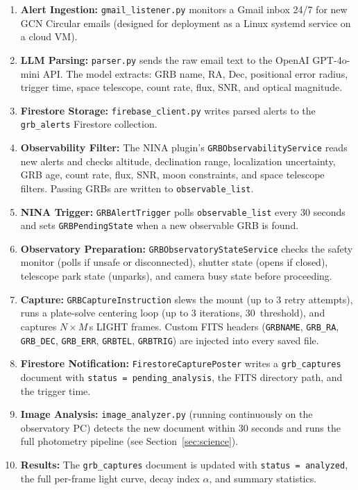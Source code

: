 \documentclass[12pt,a4paper]{article}
\begin{document}
\begin{enumerate}[leftmargin=*]
    \item \textbf{Alert Ingestion:} \texttt{gmail\_listener.py} monitors a
          Gmail inbox 24/7 for new GCN Circular emails (designed for
          deployment as a Linux systemd service on a cloud VM).
    \item \textbf{LLM Parsing:} \texttt{parser.py} sends the raw email text
          to the OpenAI GPT-4o-mini API. The model extracts: GRB name, RA,
          Dec, positional error radius, trigger time, space telescope,
          count rate, flux, SNR, and optical magnitude.
    \item \textbf{Firestore Storage:} \texttt{firebase\_client.py} writes
          parsed alerts to the \texttt{grb\_alerts} Firestore collection.
    \item \textbf{Observability Filter:} The NINA plugin's
          \texttt{GRBObservabilityService} reads new alerts and checks
          altitude, declination range, localization uncertainty, GRB age,
          count rate, flux, SNR, moon constraints, and space telescope
          filters. Passing GRBs are written to \texttt{observable\_list}.
    \item \textbf{NINA Trigger:} \texttt{GRBAlertTrigger} polls
          \texttt{observable\_list} every 30 seconds and sets
          \texttt{GRBPendingState} when a new observable GRB is found.
    \item \textbf{Observatory Preparation:} \texttt{GRBObservatoryStateService}
          checks the safety monitor (polls if unsafe or disconnected), shutter
          state (opens if closed), telescope park state (unparks), and camera
          busy state before proceeding.
    \item \textbf{Capture:} \texttt{GRBCaptureInstruction} slews the mount
          (up to 3 retry attempts), runs a plate-solve centering loop
          (up to 3 iterations, 30\arcsec\ threshold), and captures
          $N \times M$\,s LIGHT frames. Custom FITS headers
          (\texttt{GRBNAME}, \texttt{GRB\_RA}, \texttt{GRB\_DEC},
          \texttt{GRB\_ERR}, \texttt{GRBTEL}, \texttt{GRBTRIG}) are injected
          into every saved file.
    \item \textbf{Firestore Notification:} \texttt{FirestoreCapturePoster}
          writes a \texttt{grb\_captures} document with
          \texttt{status = pending\_analysis}, the FITS directory path, and
          the trigger time.
    \item \textbf{Image Analysis:} \texttt{image\_analyzer.py} (running
          continuously on the observatory PC) detects the new document within
          30 seconds and runs the full photometry pipeline (see
          Section~\ref{sec:science}).
    \item \textbf{Results:} The \texttt{grb\_captures} document is updated
          with \texttt{status = analyzed}, the full per-frame light curve,
          decay index $\alpha$, and summary statistics.
\end{enumerate}
\end{document}
